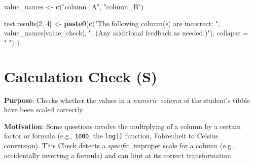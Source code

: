 \documentclass[
  12pt,
]{book}
\newenvironment{Shaded}{\begin{snugshade}}{\end{snugshade}}
\newcommand{\AttributeTok}[1]{\textcolor[rgb]{0.13,0.29,0.53}{#1}}
\newcommand{\DecValTok}[1]{\textcolor[rgb]{0.00,0.00,0.81}{#1}}
\newcommand{\FunctionTok}[1]{\textcolor[rgb]{0.13,0.29,0.53}{\textbf{#1}}}
\newcommand{\NormalTok}[1]{#1}
\newcommand{\OtherTok}[1]{\textcolor[rgb]{0.56,0.35,0.01}{#1}}
\newcommand{\StringTok}[1]{\textcolor[rgb]{0.31,0.60,0.02}{#1}}
\begin{document}
\begin{Shaded}
\begin{Highlighting}[]
\NormalTok{  value\_names }\OtherTok{\textless{}{-}} \FunctionTok{c}\NormalTok{(}\StringTok{"column\_A"}\NormalTok{, }\StringTok{"column\_B"}\NormalTok{)}
   
\NormalTok{  test.results[}\DecValTok{2}\NormalTok{, }\DecValTok{4}\NormalTok{] }\OtherTok{\textless{}{-}} \FunctionTok{paste0}\NormalTok{(}\FunctionTok{c}\NormalTok{(}\StringTok{"The following column(s) are incorrect: "}\NormalTok{, value\_names[value\_check], }\StringTok{". (Any additional feedback as needed.)"}\NormalTok{), }\AttributeTok{collapse =} \StringTok{" "}\NormalTok{)}
\NormalTok{\}}
\end{Highlighting}
\end{Shaded}

\section{Calculation Check (S)}\label{Calculation-Check}

\textbf{Purpose}: Checks whether the values in a \emph{numeric column} of the student's tibble have been scaled correctly.

\textbf{Motivation}: Some questions involve the multiplying of a column by a certain factor or formula (e.g., \texttt{1000}, the \texttt{log()} function, Fahrenheit to Celsius conversion). This Check detects a \emph{specific}, improper scale for a column (e.g., accidentally inverting a formula) and can hint at its correct transformation.
\end{document}
